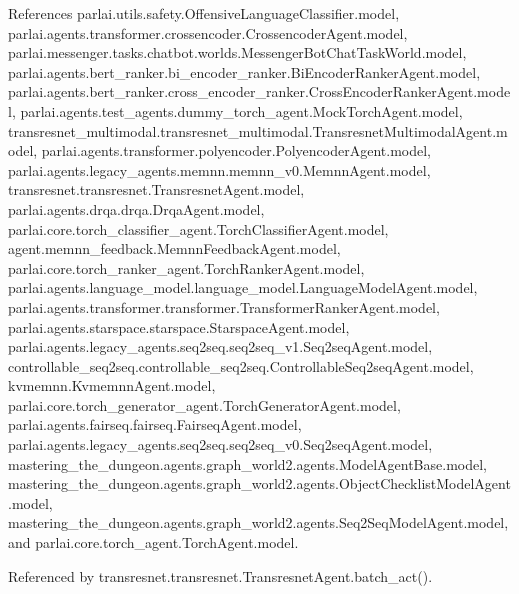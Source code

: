 References parlai.\+utils.\+safety.\+Offensive\+Language\+Classifier.\+model, parlai.\+agents.\+transformer.\+crossencoder.\+Crossencoder\+Agent.\+model, parlai.\+messenger.\+tasks.\+chatbot.\+worlds.\+Messenger\+Bot\+Chat\+Task\+World.\+model, parlai.\+agents.\+bert\+\_\+ranker.\+bi\+\_\+encoder\+\_\+ranker.\+Bi\+Encoder\+Ranker\+Agent.\+model, parlai.\+agents.\+bert\+\_\+ranker.\+cross\+\_\+encoder\+\_\+ranker.\+Cross\+Encoder\+Ranker\+Agent.\+model, parlai.\+agents.\+test\+\_\+agents.\+dummy\+\_\+torch\+\_\+agent.\+Mock\+Torch\+Agent.\+model, transresnet\+\_\+multimodal.\+transresnet\+\_\+multimodal.\+Transresnet\+Multimodal\+Agent.\+model, parlai.\+agents.\+transformer.\+polyencoder.\+Polyencoder\+Agent.\+model, parlai.\+agents.\+legacy\+\_\+agents.\+memnn.\+memnn\+\_\+v0.\+Memnn\+Agent.\+model, transresnet.\+transresnet.\+Transresnet\+Agent.\+model, parlai.\+agents.\+drqa.\+drqa.\+Drqa\+Agent.\+model, parlai.\+core.\+torch\+\_\+classifier\+\_\+agent.\+Torch\+Classifier\+Agent.\+model, agent.\+memnn\+\_\+feedback.\+Memnn\+Feedback\+Agent.\+model, parlai.\+core.\+torch\+\_\+ranker\+\_\+agent.\+Torch\+Ranker\+Agent.\+model, parlai.\+agents.\+language\+\_\+model.\+language\+\_\+model.\+Language\+Model\+Agent.\+model, parlai.\+agents.\+transformer.\+transformer.\+Transformer\+Ranker\+Agent.\+model, parlai.\+agents.\+starspace.\+starspace.\+Starspace\+Agent.\+model, parlai.\+agents.\+legacy\+\_\+agents.\+seq2seq.\+seq2seq\+\_\+v1.\+Seq2seq\+Agent.\+model, controllable\+\_\+seq2seq.\+controllable\+\_\+seq2seq.\+Controllable\+Seq2seq\+Agent.\+model, kvmemnn.\+Kvmemnn\+Agent.\+model, parlai.\+core.\+torch\+\_\+generator\+\_\+agent.\+Torch\+Generator\+Agent.\+model, parlai.\+agents.\+fairseq.\+fairseq.\+Fairseq\+Agent.\+model, parlai.\+agents.\+legacy\+\_\+agents.\+seq2seq.\+seq2seq\+\_\+v0.\+Seq2seq\+Agent.\+model, mastering\+\_\+the\+\_\+dungeon.\+agents.\+graph\+\_\+world2.\+agents.\+Model\+Agent\+Base.\+model, mastering\+\_\+the\+\_\+dungeon.\+agents.\+graph\+\_\+world2.\+agents.\+Object\+Checklist\+Model\+Agent.\+model, mastering\+\_\+the\+\_\+dungeon.\+agents.\+graph\+\_\+world2.\+agents.\+Seq2\+Seq\+Model\+Agent.\+model, and parlai.\+core.\+torch\+\_\+agent.\+Torch\+Agent.\+model.



Referenced by transresnet.\+transresnet.\+Transresnet\+Agent.\+batch\+\_\+act().

